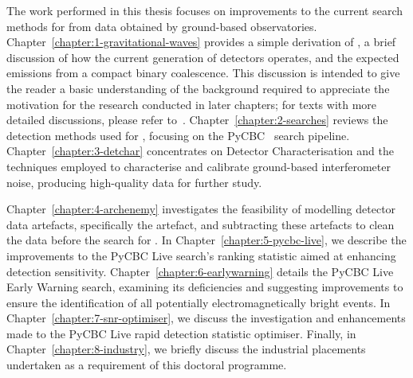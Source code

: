 The work performed in this thesis focuses on improvements to the current search methods for \gws from data obtained by ground-based \gwadj observatories. Chapter~\ref{chapter:1-gravitational-waves} provides a simple derivation of \gws, a brief discussion of how the current generation of detectors operates, and the expected \gwadj emissions from a compact binary coalescence. This discussion is intended to give the reader a basic understanding of the background required to appreciate the motivation for the research conducted in later chapters; for texts with more detailed discussions, please refer to~\cite{Moore_book:2012, Maggiore_book:2007, Schutz_book:2009}. Chapter~\ref{chapter:2-searches} reviews the detection methods used for \gws, focusing on the PyCBC~\cite{PyCBC:2016} search pipeline. Chapter~\ref{chapter:3-detchar} concentrates on Detector Characterisation and the techniques employed to characterise and calibrate ground-based interferometer noise, producing high-quality data for further study.

Chapter~\ref{chapter:4-archenemy} investigates the feasibility of modelling \gwadj detector data artefacts, specifically the \scladj artefact, and subtracting these artefacts to clean the data before the search for \gws. In Chapter~\ref{chapter:5-pycbc-live}, we describe the improvements to the PyCBC Live search's ranking statistic aimed at enhancing detection sensitivity. Chapter~\ref{chapter:6-earlywarning} details the PyCBC Live Early Warning search, examining its deficiencies and suggesting improvements to ensure the identification of all potentially electromagnetically bright events. In Chapter~\ref{chapter:7-snr-optimiser}, we discuss the investigation and enhancements made to the PyCBC Live rapid detection statistic optimiser. Finally, in Chapter~\ref{chapter:8-industry}, we briefly discuss the industrial placements undertaken as a requirement of this doctoral programme.
